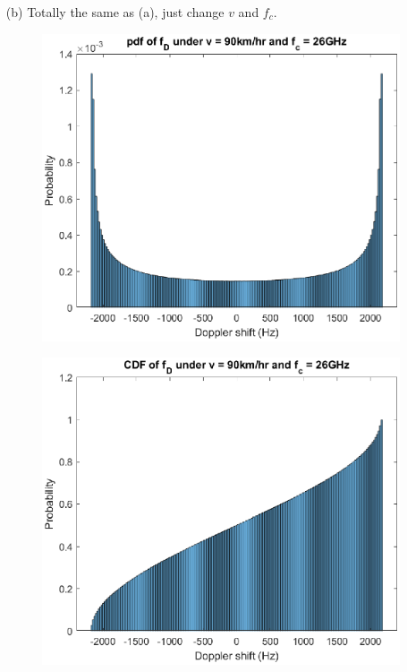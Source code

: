 \begin{itemize}
\begin{figure}[H]
    \end{figure}
    \item[(b)] Totally the same as (a), just change $v$ and $f_c$.
    \begin{figure}[H]
        \centering
        \includegraphics[scale = 0.8]{b_pdf.eps}
    \end{figure}
    \begin{figure}[H]
        \centering
        \includegraphics[scale = 0.8]{b_cdf.eps}
    \end{figure}

\end{itemize}
